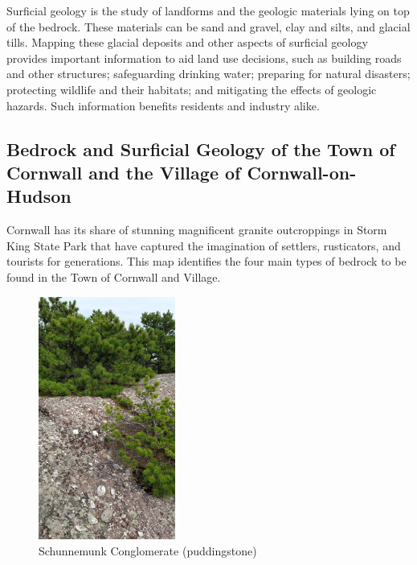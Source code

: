 Surficial geology is the study of landforms and the geologic materials lying on 
top of the bedrock. These materials can be sand and gravel, clay and silts, and 
glacial tills. Mapping these glacial deposits and other aspects of surficial 
geology provides important information to aid land use decisions, such as 
building roads and other structures; safeguarding drinking water; preparing for 
natural disasters; protecting wildlife and their habitats; and mitigating the 
effects of geologic hazards. Such information benefits residents and industry 
alike.

\label{map:bedrockgeology}

\subsection*{Bedrock and Surficial Geology of the Town of Cornwall and the 
Village of Cornwall-on-Hudson}
Cornwall has its share of stunning magnificent granite outcroppings in Storm 
King State Park that have captured the imagination of settlers, rusticators, 
and tourists for generations. This map identifies the four main types of 
bedrock to be found in the Town of Cornwall and Village.
\vspace{4mm}
\begin{figure}
    \centering
        \includegraphics[width=0.4\textwidth]{images/Pudingstone.jpg}
        \caption{Schunnemunk Conglomerate (puddingstone)}\label{Schunnemunk Conglomerate}
\end{figure}
